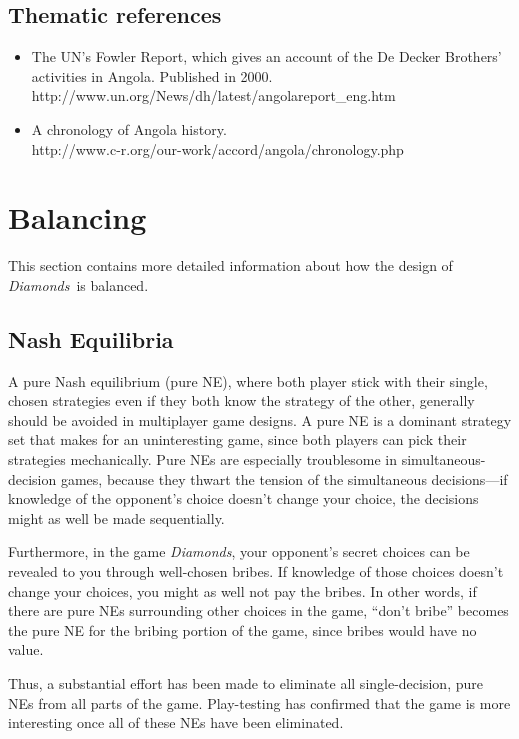 \documentclass[12pt]{article}
\newcommand{\gtitle}{{\it Diamonds}}
\begin{document}
\subsection{Thematic references}
\begin{itemize}
\item The UN's Fowler Report, which gives an account of the De Decker Brothers' activities in Angola.  Published in 2000.\\
http://www.un.org/News/dh/latest/angolareport\_eng.htm

\item A chronology of Angola history.\\
http://www.c-r.org/our-work/accord/angola/chronology.php
\end{itemize}


\newpage

\section{Balancing}
This section contains more detailed information about how the design of \gtitle\ is balanced.

\subsection{Nash Equilibria}
A pure Nash equilibrium (pure NE), where both player stick with their single, chosen strategies even if they both know the strategy of the other, generally should be avoided in multiplayer game designs.  A pure NE is a dominant strategy set that makes for an uninteresting game, since both players can pick their strategies mechanically.  Pure NEs are especially troublesome in simultaneous-decision games, because they thwart the tension of the simultaneous decisions---if knowledge of the opponent's choice doesn't change your choice, the decisions might as well be made sequentially.

Furthermore, in the game \gtitle, your opponent's secret choices can be revealed to you through well-chosen bribes.  If knowledge of those choices doesn't change your choices, you might as well not pay the bribes.  In other words, if there are pure NEs surrounding other choices in the game, ``don't bribe'' becomes the pure NE for the bribing portion of the game, since bribes would have no value.

Thus, a substantial effort has been made to eliminate all single-decision, pure NEs from all parts of the game.  Play-testing has confirmed that the game is more interesting once all of these NEs have been eliminated.
\end{document}
